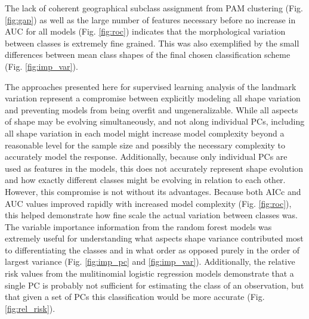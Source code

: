 \documentclass[12pt,letterpaper]{article}\usepackage{graphicx, color}
\begin{document}

The lack of coherent geographical subclass assignment from PAM clustering (Fig. \ref{fig:gap}) as well as the large number of features necessary before no increase in AUC for all models (Fig. \ref{fig:roc}) indicates that the morphological variation between classes is extremely fine grained. This was also exemplified by the small differences between mean class shapes of the final chosen classification scheme (Fig. \ref{fig:imp_var}).

The approaches presented here for supervised learning analysis of the landmark variation represent a compromise between explicitly modeling all shape variation and preventing models from being overfit and ungeneralizable. While all aspects of shape may be evolving simultaneously, and not along individual PCs, including all shape variation in each model might increase model complexity beyond a reasonable level for the sample size and possibly the necessary complexity to accurately model the response. Additionally, because only individual PCs are used as features in the models, this does not accurately represent shape evolution and how exactly different classes might be evolving in relation to each other. However, this compromise is not without its advantages. Because both AICc and AUC values improved rapidly with increased model complexity (Fig. \ref{fig:roc}), this helped demonstrate how fine scale the actual variation between classes was. The variable importance information from the random forest models was extremely useful for understanding what aspects shape variance contributed most to differentiating the classes and in what order as opposed purely in the order of largest variance (Fig. \ref{fig:imp_pc} and \ref{fig:imp_var}). Additionally, the relative risk values from the mulitinomial logistic regression models demonstrate that a single PC is probably not sufficient for estimating the class of an observation, but that given a set of PCs this classification would be more accurate (Fig. \ref{fig:rel_risk}).
\end{document}

